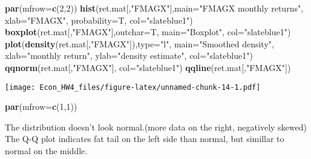 \documentclass[]{article}
\newenvironment{Shaded}{\begin{snugshade}}{\end{snugshade}}
\newcommand{\KeywordTok}[1]{\textcolor[rgb]{0.13,0.29,0.53}{\textbf{#1}}}
\newcommand{\DataTypeTok}[1]{\textcolor[rgb]{0.13,0.29,0.53}{#1}}
\newcommand{\DecValTok}[1]{\textcolor[rgb]{0.00,0.00,0.81}{#1}}
\newcommand{\StringTok}[1]{\textcolor[rgb]{0.31,0.60,0.02}{#1}}
\newcommand{\NormalTok}[1]{#1}
\begin{document}
\begin{Shaded}
\begin{Highlighting}[]
\KeywordTok{par}\NormalTok{(}\DataTypeTok{mfrow=}\KeywordTok{c}\NormalTok{(}\DecValTok{2}\NormalTok{,}\DecValTok{2}\NormalTok{))}
    \KeywordTok{hist}\NormalTok{(ret.mat[,}\StringTok{"FMAGX"}\NormalTok{],}\DataTypeTok{main=}\StringTok{"FMAGX monthly returns"}\NormalTok{,}
         \DataTypeTok{xlab=}\StringTok{"FMAGX"}\NormalTok{, }\DataTypeTok{probability=}\NormalTok{T, }\DataTypeTok{col=}\StringTok{"slateblue1"}\NormalTok{)}
    \KeywordTok{boxplot}\NormalTok{(ret.mat[,}\StringTok{"FMAGX"}\NormalTok{],}\DataTypeTok{outchar=}\NormalTok{T, }\DataTypeTok{main=}\StringTok{"Boxplot"}\NormalTok{, }\DataTypeTok{col=}\StringTok{"slateblue1"}\NormalTok{)}
    \KeywordTok{plot}\NormalTok{(}\KeywordTok{density}\NormalTok{(ret.mat[,}\StringTok{"FMAGX"}\NormalTok{]),}\DataTypeTok{type=}\StringTok{"l"}\NormalTok{, }\DataTypeTok{main=}\StringTok{"Smoothed density"}\NormalTok{,}
         \DataTypeTok{xlab=}\StringTok{"monthly return"}\NormalTok{, }\DataTypeTok{ylab=}\StringTok{"density estimate"}\NormalTok{, }\DataTypeTok{col=}\StringTok{"slateblue1"}\NormalTok{)}
    \KeywordTok{qqnorm}\NormalTok{(ret.mat[,}\StringTok{"FMAGX"}\NormalTok{], }\DataTypeTok{col=}\StringTok{"slateblue1"}\NormalTok{)}
    \KeywordTok{qqline}\NormalTok{(ret.mat[,}\StringTok{"FMAGX"}\NormalTok{])}
\end{Highlighting}
\end{Shaded}

\texttt{[image: Econ\_HW4\_files/figure-latex/unnamed-chunk-14-1.pdf]}

\begin{Shaded}
\begin{Highlighting}[]
\KeywordTok{par}\NormalTok{(}\DataTypeTok{mfrow=}\KeywordTok{c}\NormalTok{(}\DecValTok{1}\NormalTok{,}\DecValTok{1}\NormalTok{))}
\end{Highlighting}
\end{Shaded}

The distribution doesn't look normal.(more data on the right, negatively
skewed) The Q-Q plot indicates fat tail on the left side than normal,
but simillar to normal on the middle.
\end{document}
